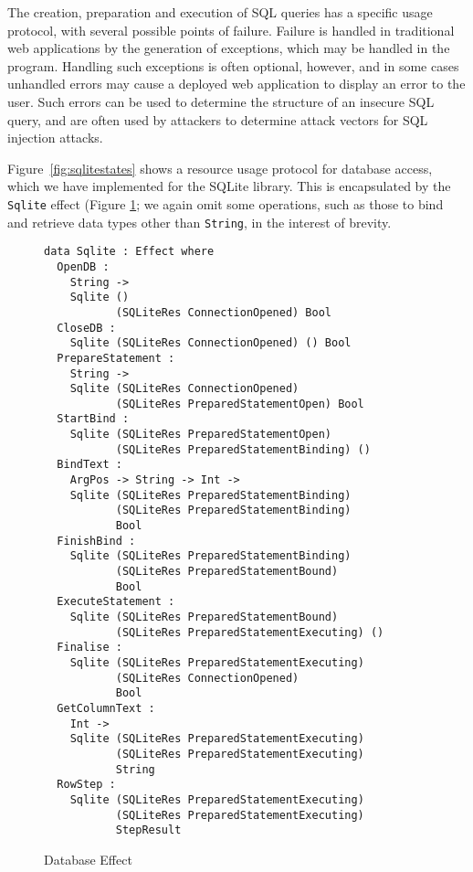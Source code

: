 \documentclass[preprint]{sigplanconf}
\begin{document}
The creation, preparation and execution of SQL queries has a specific usage protocol, with several possible points of failure. Failure is handled in traditional web applications by the generation of exceptions, which may be handled in the program.
Handling such exceptions is often optional, however, and in some cases unhandled errors may cause a deployed web application to display an error to the user. Such errors can be used to determine the structure of an insecure SQL query, and are often used by attackers to determine attack vectors for SQL injection attacks.

Figure~\ref{fig:sqlitestates} shows a resource usage protocol for database
access, which we have implemented for the SQLite library. This is encapsulated
by the \texttt{Sqlite} effect (Figure \ref{fig:dbeffect}; we again omit some operations, such as those to
bind and retrieve data types other than \texttt{String}, in the interest of
brevity.

\begin{figure}[h]
\begin{Verbatim}[samepage]
data Sqlite : Effect where
  OpenDB : 
    String -> 
    Sqlite () 
           (SQLiteRes ConnectionOpened) Bool
  CloseDB : 
    Sqlite (SQLiteRes ConnectionOpened) () Bool
  PrepareStatement : 
    String -> 
    Sqlite (SQLiteRes ConnectionOpened) 
           (SQLiteRes PreparedStatementOpen) Bool
  StartBind : 
    Sqlite (SQLiteRes PreparedStatementOpen) 
           (SQLiteRes PreparedStatementBinding) ()
  BindText : 
    ArgPos -> String -> Int -> 
    Sqlite (SQLiteRes PreparedStatementBinding) 
           (SQLiteRes PreparedStatementBinding) 
           Bool
  FinishBind : 
    Sqlite (SQLiteRes PreparedStatementBinding) 
           (SQLiteRes PreparedStatementBound) 
           Bool
  ExecuteStatement : 
    Sqlite (SQLiteRes PreparedStatementBound) 
           (SQLiteRes PreparedStatementExecuting) ()
  Finalise : 
    Sqlite (SQLiteRes PreparedStatementExecuting) 
           (SQLiteRes ConnectionOpened) 
           Bool
  GetColumnText : 
    Int -> 
    Sqlite (SQLiteRes PreparedStatementExecuting)
           (SQLiteRes PreparedStatementExecuting)
           String
  RowStep : 
    Sqlite (SQLiteRes PreparedStatementExecuting)
           (SQLiteRes PreparedStatementExecuting)
           StepResult
\end{Verbatim}
\caption{Database Effect}
\label{fig:dbeffect}
\end{figure}
\end{document}
